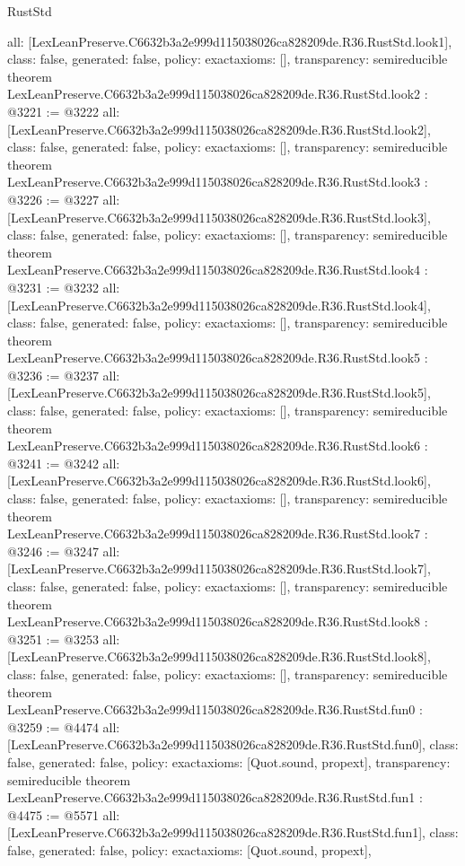 \begin{lexlean}{RustStd}
\begin{coremodule}
{  all: [LexLeanPreserve.C6632b3a2e999d115038026ca828209de.R36.RustStd.look1],
  class: false,
  generated: false,
  policy: exact{axioms: []},
  transparency: semireducible
}
theorem LexLeanPreserve.C6632b3a2e999d115038026ca828209de.R36.RustStd.look2 : @3221 := @3222 {
  all: [LexLeanPreserve.C6632b3a2e999d115038026ca828209de.R36.RustStd.look2],
  class: false,
  generated: false,
  policy: exact{axioms: []},
  transparency: semireducible
}
theorem LexLeanPreserve.C6632b3a2e999d115038026ca828209de.R36.RustStd.look3 : @3226 := @3227 {
  all: [LexLeanPreserve.C6632b3a2e999d115038026ca828209de.R36.RustStd.look3],
  class: false,
  generated: false,
  policy: exact{axioms: []},
  transparency: semireducible
}
theorem LexLeanPreserve.C6632b3a2e999d115038026ca828209de.R36.RustStd.look4 : @3231 := @3232 {
  all: [LexLeanPreserve.C6632b3a2e999d115038026ca828209de.R36.RustStd.look4],
  class: false,
  generated: false,
  policy: exact{axioms: []},
  transparency: semireducible
}
theorem LexLeanPreserve.C6632b3a2e999d115038026ca828209de.R36.RustStd.look5 : @3236 := @3237 {
  all: [LexLeanPreserve.C6632b3a2e999d115038026ca828209de.R36.RustStd.look5],
  class: false,
  generated: false,
  policy: exact{axioms: []},
  transparency: semireducible
}
theorem LexLeanPreserve.C6632b3a2e999d115038026ca828209de.R36.RustStd.look6 : @3241 := @3242 {
  all: [LexLeanPreserve.C6632b3a2e999d115038026ca828209de.R36.RustStd.look6],
  class: false,
  generated: false,
  policy: exact{axioms: []},
  transparency: semireducible
}
theorem LexLeanPreserve.C6632b3a2e999d115038026ca828209de.R36.RustStd.look7 : @3246 := @3247 {
  all: [LexLeanPreserve.C6632b3a2e999d115038026ca828209de.R36.RustStd.look7],
  class: false,
  generated: false,
  policy: exact{axioms: []},
  transparency: semireducible
}
theorem LexLeanPreserve.C6632b3a2e999d115038026ca828209de.R36.RustStd.look8 : @3251 := @3253 {
  all: [LexLeanPreserve.C6632b3a2e999d115038026ca828209de.R36.RustStd.look8],
  class: false,
  generated: false,
  policy: exact{axioms: []},
  transparency: semireducible
}
theorem LexLeanPreserve.C6632b3a2e999d115038026ca828209de.R36.RustStd.fun0 : @3259 := @4474 {
  all: [LexLeanPreserve.C6632b3a2e999d115038026ca828209de.R36.RustStd.fun0],
  class: false,
  generated: false,
  policy: exact{axioms: [Quot.sound, propext]},
  transparency: semireducible
}
theorem LexLeanPreserve.C6632b3a2e999d115038026ca828209de.R36.RustStd.fun1 : @4475 := @5571 {
  all: [LexLeanPreserve.C6632b3a2e999d115038026ca828209de.R36.RustStd.fun1],
  class: false,
  generated: false,
  policy: exact{axioms: [Quot.sound, propext]},
}
\end{coremodule}
\end{lexlean}
